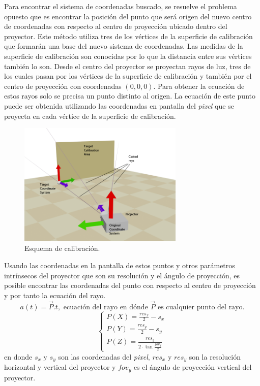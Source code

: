 Para encontrar el sistema de coordenadas buscado, se resuelve el problema opuesto que es encontrar la posición del punto que será origen del nuevo centro de coordenadas con respecto al centro de proyección ubicado dentro del proyector. Este método utiliza tres de los vértices de la superficie de calibración que formarán una base del nuevo sistema de coordenadas. Las medidas de la superficie de calibración son conocidas por lo que la distancia entre sus vértices también lo son. Desde el centro del proyector se proyectan rayos de luz, tres de los cuales pasan por los vértices de la superficie de calibración y también por el centro de proyección con coordenadas $(0, 0, 0)$. Para obtener la ecuación de estos rayos solo se precisa un punto distinto al origen. La ecuación de este punto puede ser obtenida utilizando las coordenadas en pantalla del \emph{pixel} que se proyecta en cada vértice de la superficie de calibración.
\begin{figure}[H]
  \centering
    \includegraphics[width=0.7\textwidth]{./Cap2_videomapping/CalibrationSketch}
  \caption{Esquema de calibración.}
  \label{fig:CalibrationSketch}
\end{figure}
Usando las coordenadas en la pantalla de estos puntos y otros parámetros intrínsecos del proyector que son su resolución y el ángulo de proyección, es posible encontrar las coordenadas del punto con respecto al centro de proyección y por tanto la ecuación del rayo.
\[
a(t) = \vec{P} . t,	\mbox{ ecuación del rayo en dónde } \vec{P} \mbox{ es cualquier punto del rayo.}
\]
\[
\begin{cases}
P(X) = \frac{res_x}{2} - s_x \\
P(Y) = \frac{res_y}{2} - s_y \\
P(Z) = \frac{res_y}{2 \cdot \tan \frac{fov_y}{2}}
\end{cases}
\]
en donde $s_x$ y $s_y$ son las coordenadas del \emph{pixel}, $res_x$ y $res_y$ son la resolución horizontal y vertical del proyector y $fov_y$ es el ángulo de proyección vertical del proyector.

